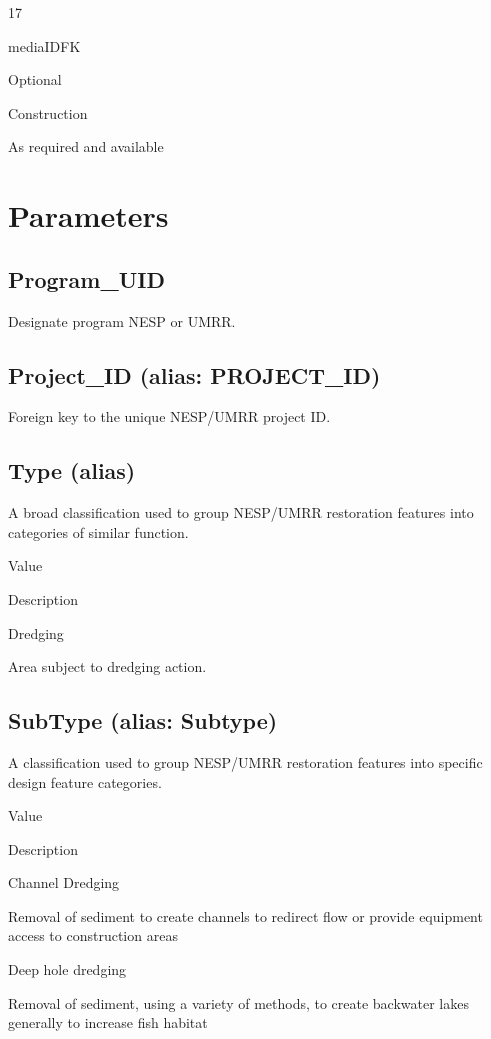 \documentclass[
  letterpaper,
  DIV=11,
  numbers=noendperiod]{scrreprt}
\begin{document}
17

mediaIDFK

Optional

Construction

As required and available

\section{Parameters}\label{parameters}

\subsection{Program\_UID}\label{program_uid}

Designate program NESP or UMRR.

\subsection{Project\_ID (alias:
PROJECT\_ID)}\label{project_id-alias-project_id}

Foreign key to the unique NESP/UMRR project ID.

\subsection{Type (alias)}\label{type-alias}

A broad classification used to group NESP/UMRR restoration features into
categories of similar function.

Value

Description

Dredging

Area subject to dredging action.

\subsection{SubType (alias: Subtype)}\label{subtype-alias-subtype}

A classification used to group NESP/UMRR restoration features into
specific design feature categories.

Value

Description

Channel Dredging

Removal of sediment to create channels to redirect flow or provide
equipment access to construction areas

Deep hole dredging

Removal of sediment, using a variety of methods, to create backwater
lakes generally to increase fish habitat
\end{document}
